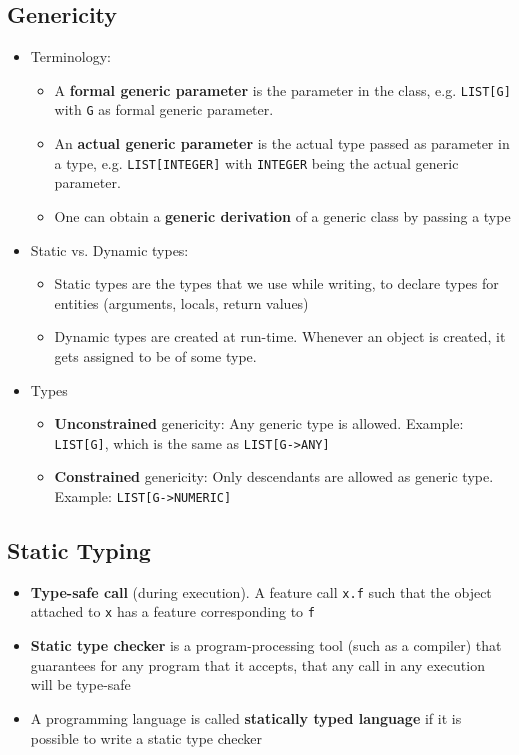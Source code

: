 \documentclass[a4paper]{article}
\newcommand{\inline}[1]{\lstinline!#1!}%
\begin{document}
\subsection{Genericity}
\begin{itemize}
\item Terminology:
\begin{itemize}
\item A \textbf{formal generic parameter} is the parameter in the class, e.g. \inline{LIST[G]} with \inline{G} as formal generic parameter.
\item An \textbf{actual generic parameter} is the actual type passed as parameter in a type, e.g. \inline{LIST[INTEGER]} with \inline{INTEGER} being the actual generic parameter. 
\item One can obtain a \textbf{generic derivation} of a generic class by passing a type
\end{itemize}
\item Static vs. Dynamic types:
\begin{itemize}
\item Static types are the types that we use while writing, to declare types for entities (arguments, locals, return values)
\item Dynamic types are created at run-time. Whenever an object is created, it gets assigned to be of some type. 
\end{itemize}
\item Types
\begin{itemize}
\item \textbf{Unconstrained} genericity: Any generic type is allowed. Example: \inline{LIST[G]}, which is the same as \inline{LIST[G->ANY]}
\item \textbf{Constrained} genericity: Only descendants are allowed as generic type. Example: \inline{LIST[G->NUMERIC]}
\end{itemize}
\end{itemize}

\subsection{Static Typing}
\begin{itemize}
\item \textbf{Type-safe call} (during execution). A feature call \inline{x.f} such that the object attached to \inline{x} has a feature corresponding to \inline{f}
\item \textbf{Static type checker} is a program-processing tool (such as a compiler) that guarantees for any program that it accepts, that any call in any execution will be type-safe
\item A programming language is called \textbf{statically typed language} if it is possible to write a static type checker
\end{itemize}
\end{document}
